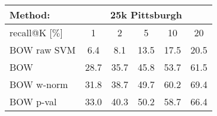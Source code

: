 
	\begin{tabularx}{0.845\linewidth}{|l|c c c c c|}
		\hline 
		\rowcolor{maroon!50}
		Method: & \multicolumn{5}{c|}{25k Pittsburgh} \\
		\hline 
		\hline 
		\rowcolor{maroon!50}
		recall@K [$\%$] & 1 & 2 & 5 & 10 & 20 \\
		\hline
		\rowcolor{maroon!10}
      \rowcolor{maroon!10}
    BOW raw SVM   & 6.4   & 8.1   & 13.5  & 17.5  & 20.5 \\
		  \rowcolor{maroon!10}
    BOW           & 28.7  & 35.7  & 45.8 & 53.7   & 61.5 \\
        \rowcolor{maroon!10}
		BOW w-norm  & 31.8    & 38.7  & 49.7  & 60.2  & 69.4 \\
      \rowcolor{maroon!10}
    BOW p-val     & 33.0  & 40.3  & 50.2 & 58.7   &  66.4 \\
    \hline
\end{tabularx}
